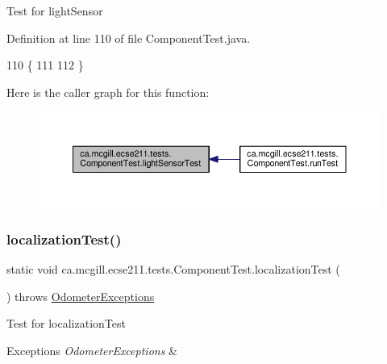Test for light\+Sensor 

Definition at line 110 of file Component\+Test.\+java.


\begin{DoxyCode}
110                                        \{
111 
112   \}
\end{DoxyCode}
Here is the caller graph for this function\+:\nopagebreak
\begin{figure}[H]
\begin{center}
\leavevmode
\includegraphics[width=350pt]{enumca_1_1mcgill_1_1ecse211_1_1tests_1_1_component_test_a3e8288f482b3806a0f3c4668951f3e36_icgraph}
\end{center}
\end{figure}
\mbox{\label{enumca_1_1mcgill_1_1ecse211_1_1tests_1_1_component_test_ad11712dd74c5c64e84cd71186a59a087}} 
\subsubsection{\texorpdfstring{localization\+Test()}{localizationTest()}}
{\footnotesize\ttfamily static void ca.\+mcgill.\+ecse211.\+tests.\+Component\+Test.\+localization\+Test (\begin{DoxyParamCaption}{ }\end{DoxyParamCaption}) throws \hyperlink{classca_1_1mcgill_1_1ecse211_1_1odometer_1_1_odometer_exceptions}{Odometer\+Exceptions}\hspace{0.3cm}{\ttfamily [static]}}

Test for localization\+Test


\begin{DoxyExceptions}{Exceptions}
{\em Odometer\+Exceptions} & \\
\hline
\end{DoxyExceptions}


